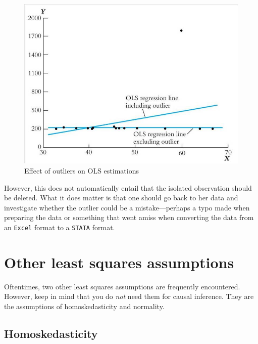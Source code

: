 \documentclass[
]{book}
\begin{document}
\begin{figure}

{\centering \includegraphics[width=600px]{./figures/Lecture1_sheet29} 

}

\caption{Effect of outliers on OLS estimations}\label{fig:outlier}
\end{figure}

However, this does not automatically entail that the isolated observation should be deleted. What it does matter is that one should go back to her data and investigate whether the outlier could be a mistake---perhaps a typo made when preparing the data or something that went amiss when converting the data from an \texttt{Excel} format to a \texttt{STATA} format.

\hypertarget{other-least-squares-assumptions}{%
\section{Other least squares assumptions}\label{other-least-squares-assumptions}}

Oftentimes, two other least squares assumptions are frequently encountered. However, keep in mind that you do \emph{not} need them for causal inference. They are the assumptions of homoskedasticity and normality.

\hypertarget{homoskedasticity}{%
\subsection{Homoskedasticity}\label{homoskedasticity}}
\end{document}
